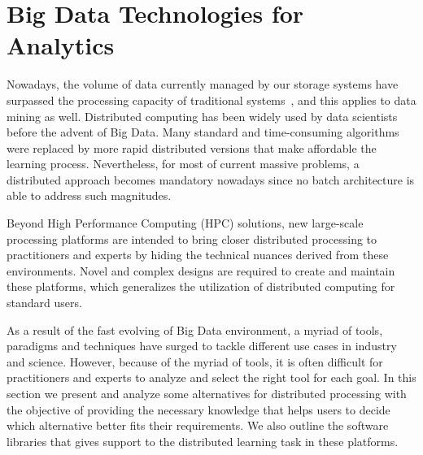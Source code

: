 \documentclass[3p,review]{elsarticle}
\begin{document}


\section{Big Data Technologies for Analytics}\label{sec:techno}


Nowadays, the volume of data currently managed by our storage systems have surpassed the processing capacity of traditional systems~\cite{wu14}, and this applies to data mining as well. Distributed computing has been widely used by data scientists before the advent of Big Data. Many standard and time-consuming algorithms were replaced by more rapid distributed versions that make affordable the learning process. Nevertheless, for most of current massive problems, a distributed approach becomes mandatory nowadays since no batch architecture is able to address such magnitudes.

Beyond High Performance Computing (HPC) solutions, new large-scale processing platforms are intended to bring closer distributed processing to practitioners and experts by hiding the technical nuances derived from these environments. Novel and complex designs are required to create and maintain these platforms, which generalizes the utilization of distributed computing for standard users. 

As a result of the fast evolving of Big Data environment, a myriad of tools, paradigms and techniques have surged to tackle different use cases in industry and science. However, because of the myriad of tools, it is often difficult for practitioners and experts to analyze and select the right tool for each goal. In this section we present and analyze some alternatives for distributed processing with the objective of providing the necessary knowledge that helps users to decide which alternative better fits their requirements. We also outline the software libraries that gives support to the distributed learning task in these platforms.
\end{document}
